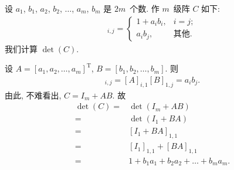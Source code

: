 \begin{example}
    设 \(a_1\), \(b_1\), \(a_2\), \(b_2\),
    \(\dots\), \(a_m\), \(b_m\) 是 \(2m\)~个数.
    作 \(m\)~级阵 \(C\) 如下:
    \begin{align*}
        [C]_{i,j} =
        \begin{cases}
            1 + a_i b_i, & i = j;     \\
            a_i b_j,     & \text{其他}.
        \end{cases}
    \end{align*}
    我们计算 \(\det {(C)}\).

    设 \(A = [a_1, a_2, \dots, a_m]^{\mathrm{T}}\),
    \(B = [b_1, b_2, \dots, b_m]\).
    则
    \begin{align*}
        [AB]_{i,j} = [A]_{i,1} [B]_{1,j} = a_i b_j.
    \end{align*}
    由此, 不难看出, \(C = I_m + AB\).
    故
    \begin{align*}
        \det {(C)}
        = {} & \det {(I_m + AB)}                        \\
        = {} & \det {(I_1 + BA)}                        \\
        = {} & [I_1 + BA]_{1,1}                         \\
        = {} & [I_1]_{1,1} + [BA]_{1,1}                 \\
        = {} & 1 + b_1 a_1 + b_2 a_2 + \dots + b_m a_m.
    \end{align*}


\end{example}

